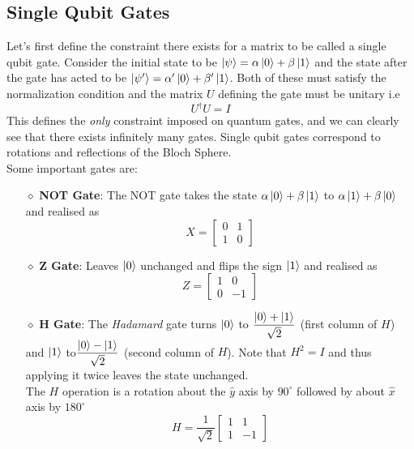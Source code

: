 \subsection{Single Qubit Gates}
Let's first define the constraint there exists for a matrix to be called a single qubit gate. Consider the initial state to be $\ket{\psi} = \alpha \ket{0} + \beta \ket{1}$ and the state after the gate has acted to be $\ket{\psi'} = \alpha' \ket{0} + \beta' \ket{1}$. Both of these must satisfy the normalization condition and the matrix $U$ defining the gate must be unitary i.e $$U^\dagger U = I$$
This defines the \textit{only} constraint imposed on quantum gates, and we can clearly see that there exists infinitely many gates. Single qubit gates correspond to rotations and reflections of the Bloch Sphere. \\
Some important gates are: 
\begin{itemize}
    \item[$\diamond$] \textbf{NOT Gate}: The NOT gate takes the state $\alpha \ket{0} + \beta \ket{1}$ to $\alpha \ket{1} + \beta \ket{0}$ and realised as \begin{equation}\label{eq-not}
        X = \begin{bmatrix}
        0 & 1 \\ 1 & 0
        \end{bmatrix}
    \end{equation}
    \item[$\diamond$] \textbf{Z Gate}: Leaves $\ket{0}$ unchanged and flips the sign $\ket{1}$ and realised as
    \begin{equation}\label{eq-z}
        Z = \begin{bmatrix}
        1& 0 \\ 0 & -1
        \end{bmatrix}
    \end{equation}
    \item[$\diamond$] \textbf{H Gate}: The \textit{Hadamard} gate turns $\ket{0}$ to $\dfrac{\ket{0} + \ket{1}}{\sqrt 2}$ (first column of $H$) and $\ket{1}$ to$\dfrac{\ket{0} - \ket{1}}{\sqrt 2}$ (second column of $H$). Note that $H^2 = I$ and thus applying it twice leaves the state unchanged. \\The $H$ operation is a rotation about the $\hat y$ axis by $90^\circ$ followed by about $\hat x$ axis by $180 ^ \circ$
    \begin{equation}\label{eq-h}
        H = \dfrac{1}{\sqrt 2}\begin{bmatrix}
        1& 1 \\ 1 & -1
        \end{bmatrix}
    \end{equation}
\end{itemize}
